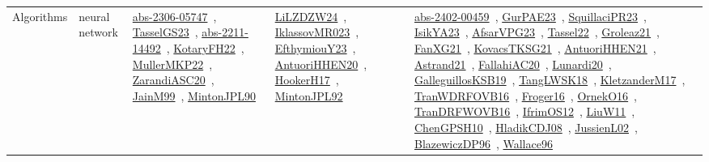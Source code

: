 {\begin{longtable}{lp{3cm}>{\raggedright\arraybackslash}p{6cm}>{\raggedright\arraybackslash}p{6cm}>{\raggedright\arraybackslash}p{8cm}}
\index{neural network}\index{Algorithms!neural network}Algorithms & neural network & \href{../works/abs-2306-05747.pdf}{abs-2306-05747}~\cite{abs-2306-05747}, \href{../works/TasselGS23.pdf}{TasselGS23}~\cite{TasselGS23}, \href{../works/abs-2211-14492.pdf}{abs-2211-14492}~\cite{abs-2211-14492}, \href{../works/KotaryFH22.pdf}{KotaryFH22}~\cite{KotaryFH22}, \href{../works/MullerMKP22.pdf}{MullerMKP22}~\cite{MullerMKP22}, \href{../works/ZarandiASC20.pdf}{ZarandiASC20}~\cite{ZarandiASC20}, \href{../works/JainM99.pdf}{JainM99}~\cite{JainM99}, \href{../works/MintonJPL90.pdf}{MintonJPL90}~\cite{MintonJPL90} & \href{../works/LiLZDZW24.pdf}{LiLZDZW24}~\cite{LiLZDZW24}, \href{../works/IklassovMR023.pdf}{IklassovMR023}~\cite{IklassovMR023}, \href{../works/EfthymiouY23.pdf}{EfthymiouY23}~\cite{EfthymiouY23}, \href{../works/AntuoriHHEN20.pdf}{AntuoriHHEN20}~\cite{AntuoriHHEN20}, \href{../works/HookerH17.pdf}{HookerH17}~\cite{HookerH17}, \href{../works/MintonJPL92.pdf}{MintonJPL92}~\cite{MintonJPL92} & \href{../works/abs-2402-00459.pdf}{abs-2402-00459}~\cite{abs-2402-00459}, \href{../works/GurPAE23.pdf}{GurPAE23}~\cite{GurPAE23}, \href{../works/SquillaciPR23.pdf}{SquillaciPR23}~\cite{SquillaciPR23}, \href{../works/IsikYA23.pdf}{IsikYA23}~\cite{IsikYA23}, \href{../works/AfsarVPG23.pdf}{AfsarVPG23}~\cite{AfsarVPG23}, \href{../works/Tassel22.pdf}{Tassel22}~\cite{Tassel22}, \href{../works/Groleaz21.pdf}{Groleaz21}~\cite{Groleaz21}, \href{../works/FanXG21.pdf}{FanXG21}~\cite{FanXG21}, \href{../works/KovacsTKSG21.pdf}{KovacsTKSG21}~\cite{KovacsTKSG21}, \href{../works/AntuoriHHEN21.pdf}{AntuoriHHEN21}~\cite{AntuoriHHEN21}, \href{../works/Astrand21.pdf}{Astrand21}~\cite{Astrand21}, \href{../works/FallahiAC20.pdf}{FallahiAC20}~\cite{FallahiAC20}, \href{../works/Lunardi20.pdf}{Lunardi20}~\cite{Lunardi20}, \href{../works/GalleguillosKSB19.pdf}{GalleguillosKSB19}~\cite{GalleguillosKSB19}, \href{../works/TangLWSK18.pdf}{TangLWSK18}~\cite{TangLWSK18}, \href{../works/KletzanderM17.pdf}{KletzanderM17}~\cite{KletzanderM17}, \href{../works/TranWDRFOVB16.pdf}{TranWDRFOVB16}~\cite{TranWDRFOVB16}, \href{../works/Froger16.pdf}{Froger16}~\cite{Froger16}, \href{../works/OrnekO16.pdf}{OrnekO16}~\cite{OrnekO16}, \href{../works/TranDRFWOVB16.pdf}{TranDRFWOVB16}~\cite{TranDRFWOVB16}, \href{../works/IfrimOS12.pdf}{IfrimOS12}~\cite{IfrimOS12}, \href{../works/LiuW11.pdf}{LiuW11}~\cite{LiuW11}, \href{../works/ChenGPSH10.pdf}{ChenGPSH10}~\cite{ChenGPSH10}, \href{../works/HladikCDJ08.pdf}{HladikCDJ08}~\cite{HladikCDJ08}, \href{../works/JussienL02.pdf}{JussienL02}~\cite{JussienL02}, \href{../works/BlazewiczDP96.pdf}{BlazewiczDP96}~\cite{BlazewiczDP96}, \href{../works/Wallace96.pdf}{Wallace96}~\cite{Wallace96}\\

\end{longtable}}
